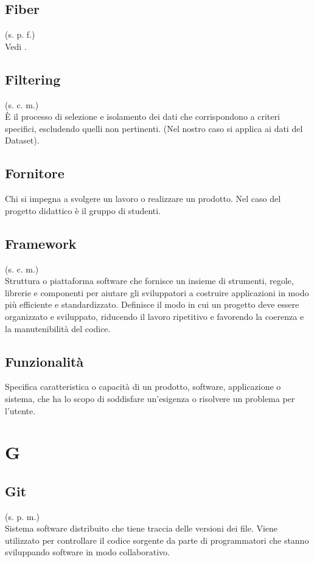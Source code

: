     \subsection{Fiber}
    (s. p. f.)\\
    Vedi .
    \subsection{Filtering}
    (s. c. m.)\\
    È il processo di selezione e isolamento dei dati che corrispondono a criteri specifici, escludendo quelli non pertinenti. (Nel nostro caso si applica ai dati del Dataset).
    \subsection{Fornitore}
    Chi si impegna a svolgere un lavoro o realizzare un prodotto. Nel caso del progetto didattico
    è il gruppo di studenti.
    \subsection{Framework}
    (s. c. m.)\\
    Struttura o piattaforma software che fornisce un insieme di strumenti, regole, 
    librerie e componenti per aiutare gli sviluppatori a costruire applicazioni 
    in modo più efficiente e standardizzato. Definisce il modo in cui un progetto 
    deve essere organizzato e sviluppato, riducendo il lavoro ripetitivo e favorendo 
    la coerenza e la manutenibilità del codice.
    \subsection{Funzionalità}
    \label{Funzionalità}
    Specifica caratteristica o capacità di un prodotto, software, applicazione o sistema, 
    che ha lo scopo di soddisfare un'esigenza o risolvere un problema per l'utente.
\pagebreak
\section{G}
    \subsection{Git}
    \label{Git}
    (s. p. m.)\\
    Sistema software distribuito che tiene traccia delle versioni dei file. 
    Viene utilizzato per controllare il codice sorgente da parte di programmatori 
    che stanno sviluppando software in modo collaborativo.
